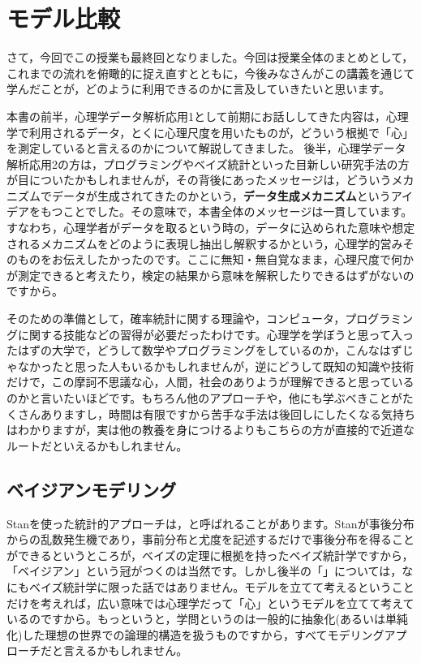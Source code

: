 \documentclass{ltjsbook}
\begin{document}
\chapter{モデル比較}
\label{x30_comparison}
さて，今回でこの授業も最終回となりました。今回は授業全体のまとめとして，これまでの流れを俯瞰的に捉え直すとともに，今後みなさんがこの講義を通じて学んだことが，どのように利用できるのかに言及していきたいと思います。

本書の前半，心理学データ解析応用1として前期にお話ししてきた内容は，心理学で利用されるデータ，とくに心理尺度を用いたものが，どういう根拠で「心」を測定していると言えるのかについて解説してきました。
後半，心理学データ解析応用2の方は，プログラミングやベイズ統計といった目新しい研究手法の方が目についたかもしれませんが，その背後にあったメッセージは，どういうメカニズムでデータが生成されてきたのかという，\textbf{データ生成メカニズム}というアイデアをもつことでした。その意味で，本書全体のメッセージは一貫しています。すなわち，心理学者がデータを取るという時の，データに込められた意味や想定されるメカニズムをどのように表現し抽出し解釈するかという，心理学的営みそのものをお伝えしたかったのです。ここに無知・無自覚なまま，心理尺度で何かが測定できると考えたり，検定の結果から意味を解釈したりできるはずがないのですから。

そのための準備として，確率統計に関する理論や，コンピュータ，プログラミングに関する技能などの習得が必要だったわけです。心理学を学ぼうと思って入ったはずの大学で，どうして数学やプログラミングをしているのか，こんなはずじゃなかったと思った人もいるかもしれませんが，逆にどうして既知の知識や技術だけで，この摩訶不思議な心，人間，社会のありようが理解できると思っているのかと言いたいほどです。もちろん他のアプローチや，他にも学ぶべきことがたくさんありますし，時間は有限ですから苦手な手法は後回しにしたくなる気持ちはわかりますが，実は他の教養を身につけるよりもこちらの方が直接的で近道なルートだといえるかもしれません。

\section{ベイジアンモデリング}
Stanを使った統計的アプローチは，と呼ばれることがあります。Stanが事後分布からの乱数発生機であり，事前分布と尤度を記述するだけで事後分布を得ることができるというところが，ベイズの定理に根拠を持ったベイズ統計学ですから，「ベイジアン」という冠がつくのは当然です。しかし後半の「」については，なにもベイズ統計学に限った話ではありません。モデルを立てて考えるということだけを考えれば，広い意味では心理学だって「心」というモデルを立てて考えているのですから。もっというと，学問というのは一般的に抽象化(あるいは単純化)した理想の世界での論理的構造を扱うものですから，すべてモデリングアプローチだと言えるかもしれません。
\end{document}
